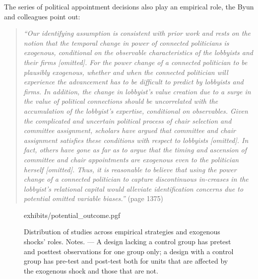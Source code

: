 \begin{refsection}
The series of political appointment decisions also play an empirical role, the 
Byun and colleagues point out: 

\begin{quote}
  \textit{
    ``Our identifying assumption is consistent with prior work and rests on the
    notion that the temporal change in power of connected politicians is
    exogenous, conditional on the observable characteristics of the lobbyists
    and their firms [omitted]. For the power change of a connected politician to
    be plausibly exogenous, whether and when the connected politician will
    experience the advancement has to be difficult to predict by lobbyists and
    firms. In addition, the change in lobbyist's value creation due to a surge
    in the value of political connections should be uncorrelated with the
    accumulation of the lobbyist's expertise, conditional on observables. Given
    the complicated and uncertain political process of chair selection and
    committee assignment, scholars have argued that committee and chair
    assignment satisfies these conditions with respect to lobbyists [omitted].
    In fact, others have gone as far as to argue that the timing and ascension
    of committee and chair appointments are exogenous even to the politician
    herself [omitted]. Thus, it is reasonable to believe that using the power
    change of a connected politician to capture discontinuous in-creases in the
    lobbyist's relational capital would alleviate identification concerns due to
    potential omitted variable biases.''
  }
  (page 1375)
\end{quote}

\begin{figure}
  \raggedleft
  \begin{small}
    {exhibits/potential_outcome.pgf}
    \caption{
      Distribution of studies across empirical strategies and exogenous shocks'
      roles. Notes. --- A design lacking a control group has pretest and posttest
      observations for one group only; a design with a control group has
      pre-test and post-test both for units that are affected by the exogenous
      shock and those that are not.
    }
    \label{fig:potential_outcome}
  \end{small}
\end{figure}


\end{refsection}
